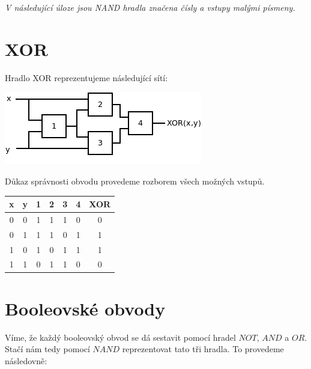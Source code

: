 \documentclass{scrartcl}
\begin{document}
\textit{V následující úloze jsou NAND hradla značena čísly a vstupy malými písmeny.}
\section{XOR}
Hradlo XOR reprezentujeme následující sítí:

\begin{center}
    \includegraphics[width=0.5\linewidth]{nand_to_xor}
\end{center}

Důkaz správnosti obvodu provedeme rozborem všech možných vstupů.

\begin{center}
    \begin{tabular}{ c | c | c | c | c | c | c }
        x & y & 1 & 2 & 3 & 4 & XOR \\ \hline
        0 & 0 & 1 & 1 & 1 & 0 & 0   \\
        0 & 1 & 1 & 1 & 0 & 1 & 1   \\
        1 & 0 & 1 & 0 & 1 & 1 & 1   \\
        1 & 1 & 0 & 1 & 1 & 0 & 0   
    \end{tabular}
\end{center}

\section{Booleovské obvody}
Víme, že každý booleovský obvod se dá sestavit pomocí hradel $NOT$, $AND$ a $OR$. Stačí nám tedy pomocí $NAND$ reprezentovat tato tři hradla. To provedeme následovně:
\end{document}
